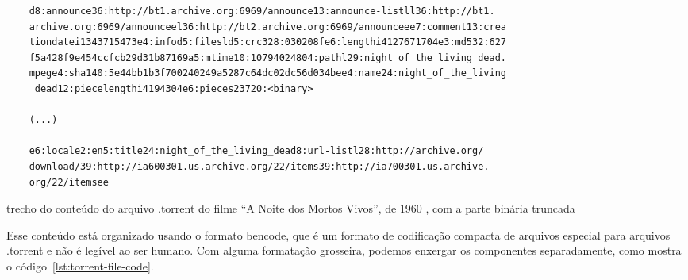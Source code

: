 \begin{listing}[H]
    \begin{verbatim}
    d8:announce36:http://bt1.archive.org:6969/announce13:announce-listll36:http://bt1.
    archive.org:6969/announceel36:http://bt2.archive.org:6969/announceee7:comment13:crea
    tiondatei1343715473e4:infod5:filesld5:crc328:030208fe6:lengthi4127671704e3:md532:627
    f5a428f9e454ccfcb29d31b87169a5:mtime10:10794024804:pathl29:night_of_the_living_dead.
    mpege4:sha140:5e44bb1b3f700240249a5287c64dc02dc56d034bee4:name24:night_of_the_living
    _dead12:piecelengthi4194304e6:pieces23720:<binary>

    (...)

    e6:locale2:en5:title24:night_of_the_living_dead8:url-listl28:http://archive.org/
    download/39:http://ia600301.us.archive.org/22/items39:http://ia700301.us.archive.
    org/22/itemsee
    \end{verbatim}

    \caption{trecho do conteúdo do arquivo .torrent do filme ``A Noite dos Mortos
    Vivos'', de 1960 \cite{torrent-file}, com a parte binária truncada}
    \label{lst:torrent-file-raw}
\end{listing}

Esse conteúdo está organizado usando o formato \gls{bencode}, que é um formato de
codificação compacta de arquivos especial para arquivos .torrent e não é legível ao ser
humano. Com alguma formatação grosseira, podemos enxergar os componentes separadamente,
como mostra o código~\ref{lst:torrent-file-code}.

